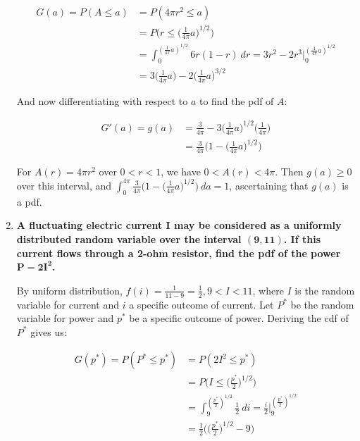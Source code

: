 \documentclass[10pt, oneside]{article}   	%
\theoremstyle{definition}
\begin{document}
\begin{enumerate}[label=5.\arabic*]
\begin{align*}
G(a) = P(A \leq a) &= P(4 \pi r^2 \leq a) \\
&= P\Big( r \leq \Big( \frac{1}{4 \pi} a \Big)^{1/2} \Big) \\
&= \int^{(\frac{1}{4 \pi} a)^{1/2}}_0 6r(1 - r) \ dr = 3r^2 - 2r^3 \Big|^{(\frac{1}{4\pi} a)^{1/2}}_0 \\
&= 3 \Big( \frac{1}{4 \pi} a \Big) - 2 \Big( \frac{1}{4 \pi} a \Big)^{3/2}
\end{align*}

And now differentiating with respect to $a$ to find the pdf of $A$:

\begin{align*}
G'(a) = g(a) &= \frac{3}{4 \pi} - 3 \Big( \frac{1}{4 \pi} a \Big)^{1/2} \Big( \frac{1}{4 \pi} \Big) \\
&= \boxed{ \frac{3}{4 \pi} \Big( 1 - \Big( \frac{1}{4 \pi} a \Big)^{1/2} \Big) }
\end{align*}

For $A(r) = 4 \pi r^2$ over $0 < r < 1$, we have $0 < A(r) < 4 \pi$. Then $g(a) \geq 0$ over this interval, and $\int^{4\pi}_0 \frac{3}{4 \pi} \Big( 1 - \Big( \frac{1}{4 \pi} a \Big)^{1/2} \Big) \ da = \boxed{1}$, ascertaining that $g(a)$ is a pdf.

\item  \begin{tcolorbox}[
  colback=Cerulean!5!white,
  colframe=Cerulean!75!black]
\textbf{A fluctuating electric current $\bm{I}$ may be considered as a uniformly distributed random variable over the interval $\bm{(9, 11)}$. If this current flows through a 2-ohm resistor, find the pdf of the power $\bm{P = 2 I^2}$.}
\end{tcolorbox}

By uniform distribution, $f(i) = \frac{1}{11 - 9} = \frac{1}{2}, 9 < I < 11$, where $I$ is the random variable for current and $i$ a specific outcome of current. Let $P^*$ be the random variable for power and $p^*$ be a specific outcome of power. Deriving the cdf of $P^*$ gives us:

\begin{align*}
G(p^*) = P(P^* \leq p^*) &= P(2 I^2 \leq p^*) \\
&= P \Big(I \leq \Big( \frac{p^*}{2} \Big)^{1/2} \Big) \\
&= \int^{( \frac{p^*}{2} )^{1/2}}_9 \frac{1}{2} \ di = \frac{i}{2} \Big|^{(\frac{p^*}{2} )^{1/2}}_9 \\
&= \frac{1}{2} \Big( \Big( \frac{p^*}{2} \Big)^{1/2} - 9 \Big)
\end{align*}


\end{enumerate}
\end{document}
